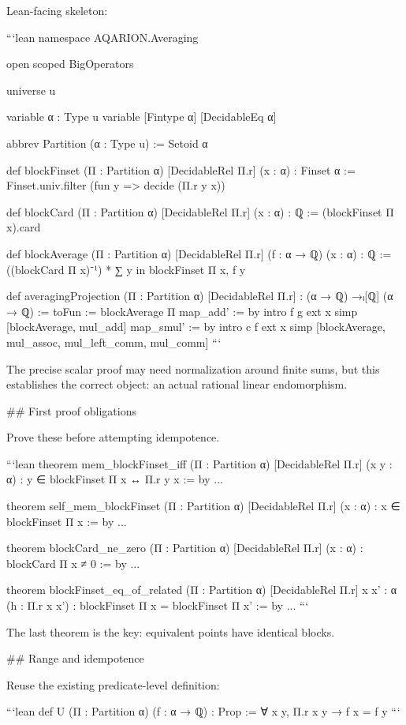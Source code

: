 Lean-facing skeleton:

```lean
namespace AQARION.Averaging

open scoped BigOperators

universe u

variable {α : Type u}
variable [Fintype α] [DecidableEq α]

abbrev Partition (α : Type u) := Setoid α

def blockFinset (Π : Partition α) [DecidableRel Π.r] (x : α) : Finset α :=
  Finset.univ.filter (fun y => decide (Π.r y x))

def blockCard (Π : Partition α) [DecidableRel Π.r] (x : α) : ℚ :=
  (blockFinset Π x).card

def blockAverage (Π : Partition α) [DecidableRel Π.r]
    (f : α → ℚ) (x : α) : ℚ :=
  ((blockCard Π x)⁻¹) *
    ∑ y in blockFinset Π x, f y

def averagingProjection (Π : Partition α) [DecidableRel Π.r] :
    (α → ℚ) →ₗ[ℚ] (α → ℚ) :=
{ toFun := blockAverage Π
  map_add' := by
    intro f g
    ext x
    simp [blockAverage, mul_add]
  map_smul' := by
    intro c f
    ext x
    simp [blockAverage, mul_assoc, mul_left_comm, mul_comm] }
```

The precise scalar proof may need normalization around finite sums, but this establishes the correct object: an actual rational linear endomorphism.

## First proof obligations

Prove these before attempting idempotence.

```lean
theorem mem_blockFinset_iff
    (Π : Partition α) [DecidableRel Π.r] (x y : α) :
    y ∈ blockFinset Π x ↔ Π.r y x := by
  ...

theorem self_mem_blockFinset
    (Π : Partition α) [DecidableRel Π.r] (x : α) :
    x ∈ blockFinset Π x := by
  ...

theorem blockCard_ne_zero
    (Π : Partition α) [DecidableRel Π.r] (x : α) :
    blockCard Π x ≠ 0 := by
  ...

theorem blockFinset_eq_of_related
    (Π : Partition α) [DecidableRel Π.r]
    {x x' : α} (h : Π.r x x') :
    blockFinset Π x = blockFinset Π x' := by
  ...
```

The last theorem is the key: equivalent points have identical blocks.

## Range and idempotence

Reuse the existing predicate-level definition:

```lean
def U (Π : Partition α) (f : α → ℚ) : Prop :=
  ∀ x y, Π.r x y → f x = f y
```

